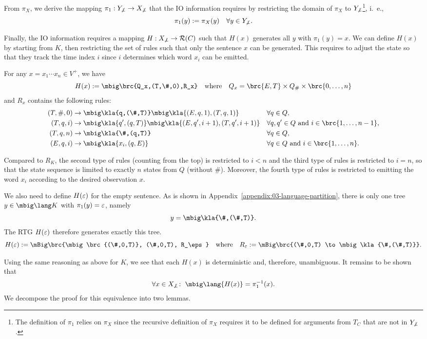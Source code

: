 From $\pi_X$, we derive the mapping $\pi_1: Y_{\not\bot} \to X_{\not\bot}$ that
the IO information requires by restricting the domain of $\pi_X$ to
$Y_{\not\bot}$\footnote{The definition of $\pi_1$ relies on $\pi_X$ since the
recursive definition of $\pi_X$ requires it to be defined for arguments from
$T_C$ that are not in $Y_{\not\bot}$.}, i.~e.,
\[
 \pi_1(y) := \pi_X(y) \quad\forall y\in Y_{\not\bot}.
\]

Finally, the IO information requires a mapping $H: X_{\not\bot}\to\mathcal R(C)$ such
that $H(x)$ generates all $y$ with $\pi_1(y)=x$. We can define $H(x)$ by
starting from $K$, then restricting the set of rules such that only the
sentence $x$ can be generated. This requires to adjust the state so that they
track the time index $i$ since $i$ determines which word $x_i$ can be emitted.

For any $x=x_1\cdots x_n\in V^+$, we have
\[
 H(x) := \mbig\brc{Q_x,(T,\#,0),R_x} \quad\text{where}\quad Q_x = \brc{E,T} \times Q_\# \times \brc{0,\ldots,n}
\]
and $R_x$ contains the following rules:
\begin{align*}\label{03-h-rules}
 (T,\#,0) &\to \mbig\kla{q,(\#,T)}\mbig\kla{(E,q,1),(T,q,1)} &&\forall q\in Q, \\
 (T,q,i) &\to \mbig\kla{q',(q,T)}\mbig\kla{(E,q',i+1),(T,q',i+1)} &&\forall q,q'\in Q \text{ and } i\in\brc{1,\ldots,n-1}, \\
 (T,q,n) &\to \mbig\kla{\#,(q,T)} &&\forall q\in Q, \\
 (E,q,i) &\to \mbig\kla{x_i,(q,E)} &&\forall q\in Q\text{ and } i\in\brc{1,\ldots,n}.
\end{align*}

Compared to $R_K$, the second type of rules (counting from the top) is
restricted to $i < n$ and the third type of rules is restricted to $i = n$, so
that the state sequence is limited to exactly $n$ states from $Q$ (without
$\#$). Moreover, the fourth type of rules is restricted to emitting the word
$x_i$ according to the desired observation $x$.

We also need to define $H(\varepsilon)$ for the empty sentence. As is shown in
Appendix~\ref{appendix:03-language-partition}, there is only one tree $y\in\mbig\lang K$ with $\pi_1(y)=\varepsilon$, namely
\[
 y = \mbig\kla{\#,(\#,T)}.
\]
The RTG $H(\varepsilon)$ therefore generates exactly this tree.
\[
 H(\eps) := \mBig\brc{\mbig\brc{(\#,0,T)}, (\#,0,T), R_\eps}
 \quad\text{where}\quad
 R_\eps := \mBig\brc{(\#,0,T) \to \mbig\kla{\#,(\#,T)}}.
\]

Using the same reasoning as above for $K$, we see that each $H(x)$ is
deterministic and, therefore, unambiguous. It remains to be shown that
\[
 \forall x\in X_{\not\bot}\colon\;
 \mbig\lang{H(x)} = \pi_1^{-1}(x).
\]
We decompose the proof for this equivalence into two lemmas.

